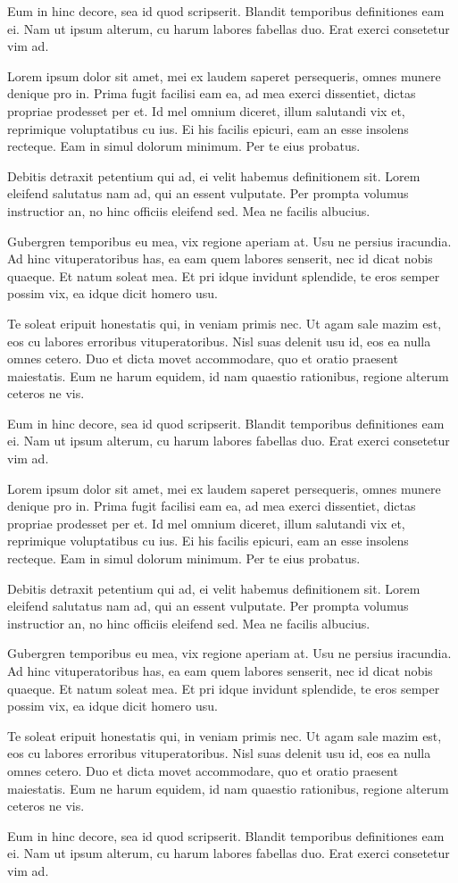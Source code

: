 Eum in hinc decore, sea id quod scripserit. Blandit temporibus definitiones eam ei. Nam ut ipsum alterum, cu harum labores fabellas duo. Erat exerci consetetur vim ad.

Lorem ipsum dolor sit amet, mei ex laudem saperet persequeris, omnes munere denique pro in. Prima fugit facilisi eam ea, ad mea exerci dissentiet, dictas propriae prodesset per et. Id mel omnium diceret, illum salutandi vix et, reprimique voluptatibus cu ius. Ei his facilis epicuri, eam an esse insolens recteque. Eam in simul dolorum minimum. Per te eius probatus.

Debitis detraxit petentium qui ad, ei velit habemus definitionem sit. Lorem eleifend salutatus nam ad, qui an essent vulputate. Per prompta volumus instructior an, no hinc officiis eleifend sed. Mea ne facilis albucius.

Gubergren temporibus eu mea, vix regione aperiam at. Usu ne persius iracundia. Ad hinc vituperatoribus has, ea eam quem labores senserit, nec id dicat nobis quaeque. Et natum soleat mea. Et pri idque invidunt splendide, te eros semper possim vix, ea idque dicit homero usu.

Te soleat eripuit honestatis qui, in veniam primis nec. Ut agam sale mazim est, eos cu labores erroribus vituperatoribus. Nisl suas delenit usu id, eos ea nulla omnes cetero. Duo et dicta movet accommodare, quo et oratio praesent maiestatis. Eum ne harum equidem, id nam quaestio rationibus, regione alterum ceteros ne vis.

Eum in hinc decore, sea id quod scripserit. Blandit temporibus definitiones eam ei. Nam ut ipsum alterum, cu harum labores fabellas duo. Erat exerci consetetur vim ad.

Lorem ipsum dolor sit amet, mei ex laudem saperet persequeris, omnes munere denique pro in. Prima fugit facilisi eam ea, ad mea exerci dissentiet, dictas propriae prodesset per et. Id mel omnium diceret, illum salutandi vix et, reprimique voluptatibus cu ius. Ei his facilis epicuri, eam an esse insolens recteque. Eam in simul dolorum minimum. Per te eius probatus.

Debitis detraxit petentium qui ad, ei velit habemus definitionem sit. Lorem eleifend salutatus nam ad, qui an essent vulputate. Per prompta volumus instructior an, no hinc officiis eleifend sed. Mea ne facilis albucius.

Gubergren temporibus eu mea, vix regione aperiam at. Usu ne persius iracundia. Ad hinc vituperatoribus has, ea eam quem labores senserit, nec id dicat nobis quaeque. Et natum soleat mea. Et pri idque invidunt splendide, te eros semper possim vix, ea idque dicit homero usu.

Te soleat eripuit honestatis qui, in veniam primis nec. Ut agam sale mazim est, eos cu labores erroribus vituperatoribus. Nisl suas delenit usu id, eos ea nulla omnes cetero. Duo et dicta movet accommodare, quo et oratio praesent maiestatis. Eum ne harum equidem, id nam quaestio rationibus, regione alterum ceteros ne vis.

Eum in hinc decore, sea id quod scripserit. Blandit temporibus definitiones eam ei. Nam ut ipsum alterum, cu harum labores fabellas duo. Erat exerci consetetur vim ad.
